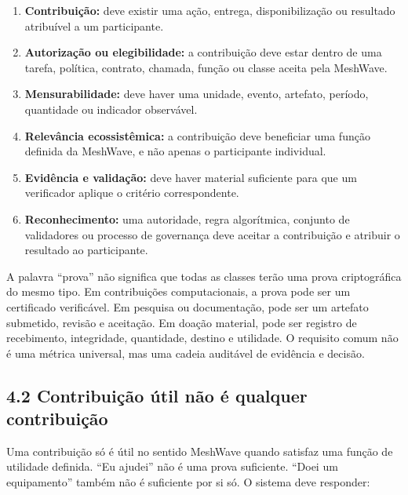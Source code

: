 \documentclass[12pt,a4paper]{article}
\begin{document}
\begin{enumerate}
\item \textbf{Contribuição:} deve existir uma ação, entrega, disponibilização ou resultado atribuível a um participante.
\item \textbf{Autorização ou elegibilidade:} a contribuição deve estar dentro de uma tarefa, política, contrato, chamada, função ou classe aceita pela MeshWave.
\item \textbf{Mensurabilidade:} deve haver uma unidade, evento, artefato, período, quantidade ou indicador observável.
\item \textbf{Relevância ecossistêmica:} a contribuição deve beneficiar uma função definida da MeshWave, e não apenas o participante individual.
\item \textbf{Evidência e validação:} deve haver material suficiente para que um verificador aplique o critério correspondente.
\item \textbf{Reconhecimento:} uma autoridade, regra algorítmica, conjunto de validadores ou processo de governança deve aceitar a contribuição e atribuir o resultado ao participante.

\end{enumerate}
A palavra “prova” não significa que todas as classes terão uma prova criptográfica do mesmo tipo. Em contribuições computacionais, a prova pode ser um certificado verificável. Em pesquisa ou documentação, pode ser um artefato submetido, revisão e aceitação. Em doação material, pode ser registro de recebimento, integridade, quantidade, destino e utilidade. O requisito comum não é uma métrica universal, mas uma cadeia auditável de evidência e decisão.\\

\subsection{4.2 Contribuição útil não é qualquer contribuição}

Uma contribuição só é útil no sentido MeshWave quando satisfaz uma função de utilidade definida. “Eu ajudei” não é uma prova suficiente. “Doei um equipamento” também não é suficiente por si só. O sistema deve responder:\\
\end{document}

